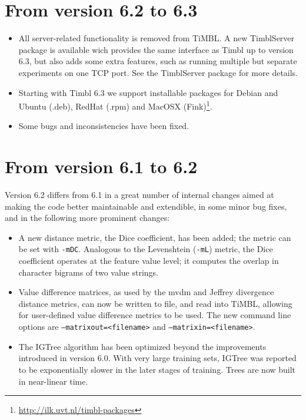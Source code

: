 \documentclass{book}
\begin{document}
\section{From version 6.2 to 6.3}

\begin{itemize}
\item All server-related functionality is removed from TiMBL. A new
  TimblServer package is available wich provides the same interface as
  Timbl up to version 6.3, but also adds some extra features, such as
  running multiple but separate experiments on one TCP port. See
  the TimblServer package for more details.

\item Starting with Timbl 6.3 we support installable packages for
  Debian and Ubuntu (.deb), RedHat (.rpm) and MacOSX
  (Fink)\footnote{\url{http://ilk.uvt.nl/timbl-packages}}.

\item Some bugs and inconsistencies have been fixed.

\end{itemize}

\section{From version 6.1 to 6.2}

Version 6.2 differs from 6.1 in a great number of internal changes
aimed at making the code better maintainable and extendible, in some
minor bug fixes, and in the following more prominent changes:

\begin{itemize}

\item A new distance metric, the Dice coefficient, has been added; the
  metric can be set with {\tt -mDC}. Analogous to the Levenshtein
  ({\tt -mL}) metric, the Dice coefficient operates at the feature
  value level; it computes the overlap in character bigrams of two
  value strings.

\item Value difference matrices, as used by the {\sc mvdm} and Jeffrey
  divergence distance metrics, can now be written to file, and read
  into TiMBL, allowing for user-defined value difference metrics to be
  used. The new command line options are {\tt --matrixout=<filename>}
  and {\tt --matrixin=<filename>}.

\item The {\sc IGTree} algorithm has been optimized beyond the
  improvements introduced in version 6.0. With very large training
  sets, {\sc IGTree} was reported to be exponentially slower in the
  later stages of training. Trees are now built in near-linear time.

\end{itemize}
\end{document}
